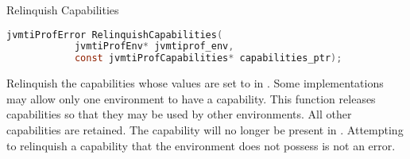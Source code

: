 \begin{apidef}{Relinquish Capabilities}
\begin{lstlisting}[language=C]
jvmtiProfError RelinquishCapabilities(
            jvmtiProfEnv* jvmtiprof_env,
            const jvmtiProfCapabilities* capabilities_ptr);
\end{lstlisting}

\begin{apidesc}
Relinquish the capabilities whose values are set to  in . Some implementations may allow only one environment to have a capability. This function releases capabilities so that they may be used by other environments. All other capabilities are retained. The capability will no longer be present in . Attempting to relinquish a capability that the environment does not possess is not an error. 
\end{apidesc}

\begin{apiphase}
\apiphaseonloadlive
\end{apiphase}

\begin{apicap}
\apicaprequired
\end{apicap}

\begin{apiparam}
\end{apiparam}

\begin{apierror}
\end{apierror}
\end{apidef}
